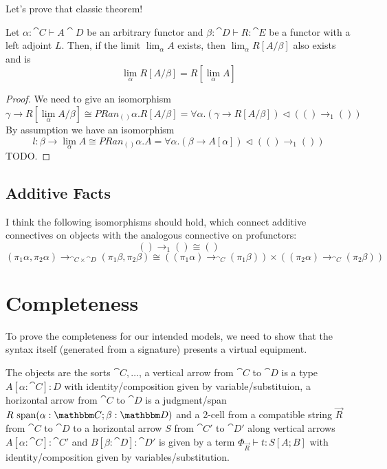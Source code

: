 \documentclass{article}
\begin{document}
Let's prove that classic theorem!

\begin{theorem}
  Let $\alpha : \cat C \vdash A \cat D$ be an arbitrary functor and
  $\beta : \cat D \vdash R : \cat E$ be a functor with a left adjoint
  $L$. Then, if the limit $\lim_\alpha A$ exists, then $\lim_\alpha
  R[A/\beta]$ also exists and is
  \[ \lim_\alpha R[A/\beta] = R[\lim_\alpha A] \]
\end{theorem}
\begin{proof}
  We need to give an isomorphism
  \[ \gamma \to R[\lim_\alpha A/\beta] \cong PRan_{()}{\alpha. R[A/\beta]} = \forall \alpha. (\gamma \to R[A/\beta]) \triangleleft (() \to_1 ()) \]
  By assumption we have an isomorphism
  \[ l : \beta \to \lim_\alpha A \cong PRan_{()}{\alpha. A} = \forall \alpha. (\beta \to A[\alpha]) \triangleleft (()\to_1 ())\]
  TODO.
\end{proof}

\subsection{Additive Facts}

I think the following isomorphisms should hold, which connect additive
connectives on objects with the analogous connective on profunctors:
\[ () \to_1 () \cong () \]
\[ (\pi_1 \alpha, \pi_2 \alpha) \to_{\cat C \times \cat D} (\pi_1 \beta, \pi_2 \beta) \cong
((\pi_1 \alpha) \to_{\cat C} (\pi_1 \beta)) \times ((\pi_2 \alpha) \to_{\cat C} (\pi_2 \beta)) \]

\section{Completeness}

To prove the completeness for our intended models, we need to show
that the syntax itself (generated from a signature) presents a virtual
equipment.

The objects are the sorts $\cat C,\ldots$, a vertical arrow from $\cat
C$ to $\cat D$ is a type $A[\alpha:\cat C] : D$ with
identity/composition given by variable/substituion, a horizontal arrow
from $\cat C$ to $\cat D$ is a judgment/span $R \prof(\alpha:\cat C;
\beta:\cat D)$ and a 2-cell from a compatible string $\vec R$ from
$\cat C$ to $\cat D$ to a horizontal arrow $S$ from $\cat C'$ to $\cat
D'$ along vertical arrows $A[\alpha : \cat C] : \cat C'$ and
$B[\beta:\cat D] : \cat D'$ is given by a term $\Phi_{\vec R} \vdash t
: S[A;B]$ with identity/composition given by variables/substitution.
\end{document}

